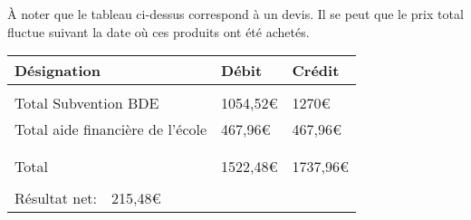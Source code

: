 \vspace{0.5cm}
\noindent À noter que le tableau ci-dessus correspond à un devis. Il se peut que le prix total fluctue suivant la date où ces produits ont été achetés.\\

\hspace{-1.65cm}
\begin{tabular}{|p{11.5cm}|p{2cm}|p{2cm}|}
	\hline
		\textbf{Désignation} & \textbf{Débit} & \textbf{Crédit}\\
		\hline
		& &\\
		Total Subvention BDE & 1054,52\euro{} & 1270\euro{}\\
		Total aide financière de l'école & 467,96\euro{} & 467,96\euro{}\\
		& &\\
		\hline
		& &\\
		Total & 1522,48\euro{} & 1737,96\euro{}\\
		& &\\
		\Large{Résultat net:\ \ 215,48\euro{}} & & \\
    \hline
\end{tabular}